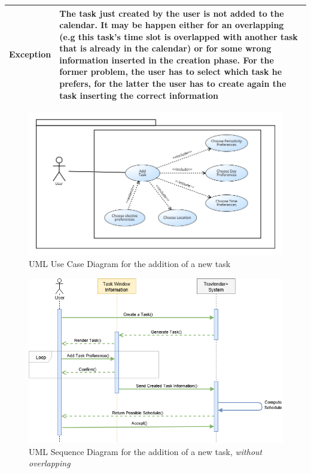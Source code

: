 \begin{table}[H]
\begin{tabular}{|p{3.5cm}|p{10.3cm}|}
    \hline
    \textbf{\large{Exception}} 			& The task just created by the user is not added to the calendar. It may be happen either for an overlapping (e.g this task's time slot is overlapped with another task that is already in the calendar) or for some wrong information inserted in the creation phase. For the former problem, the user has to select which task he prefers, for the latter the user has to create again the task inserting the correct information \\
    
    \hline
    
    
    \end{tabular}
	
\end{table}

\begin{figure}[H]
\centering
\includegraphics[scale=0.5]{Pictures/UseCaseDiagram/Adding_a_new_task.png}
\caption{UML Use Case Diagram for the addition of a new task }
\end{figure}

\begin{figure}[H]
\centering
\includegraphics[scale=0.5]{Pictures/SequenceDiagram/adding_a_task.png}
\caption{UML Sequence Diagram for the addition of a new task, \emph{without overlapping}}
\end{figure}

